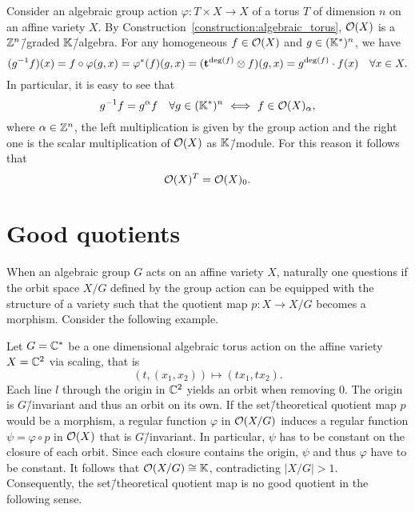\begin{ex}
	\label{example:regular_functions_torus_group_action}
	Consider an algebraic group action $\varphi\colon T \times X \rightarrow X$ of a torus $T$ of dimension $n$ on an affine variety $X$. By Construction~\ref{construction:algebraic_torus}, $\mathcal{O}(X)$ is a $\mathbb{Z}^n$\=/graded $\mathbb{K}$\=/algebra. For any homogeneous $f\in\mathcal{O}(X)$ and $g\in (\mathbb{K}^*)^n$, we have
	$$(g^{-1}f)(x) = f \circ \varphi(g,x) = \varphi^*(f)(g,x) = (\mathbf{t}^{\deg(f)} \otimes f)(g,x) = g^{\deg(f)}\cdot f(x)\quad \forall x\in X.$$
	In particular, it is easy to see that
	$$g^{-1}f = g^\alpha f\quad \forall g\in (\field^*)^n \ \Longleftrightarrow \ f\in\O(X)_\alpha,$$
	where $\alpha\in\mathbb{Z}^n$, the left multiplication is given by the group action and the right one is the scalar multiplication of $\mathcal{O}(X)$ as $\mathbb{K}$\=/module.
	For this reason it follows that
	$$ \mathcal{O}(X)^T = \mathcal{O}(X)_0.$$
\end{ex}

\section{Good quotients}
When an algebraic group $G$ acts on an affine variety $X$, naturally one questions if the orbit space $X/G$ defined by the group action can be equipped with the structure of a variety such that the quotient map $p\colon X\rightarrow X/G$ becomes a morphism. Consider the following example.

\begin{ex}
	\label{example:bad_quotient}
	Let $G=\mathbb{C}^*$ be a one dimensional algebraic torus action on the affine variety $X = \mathbb{C}^2$ via scaling, that is
	$$(t,(x_1,x_2)) \mapsto (tx_1,tx_2).$$
	Each line $l$ through the origin in $\mathbb{C}^2$ yields an orbit when removing 0. The origin is $G$\=/invariant and thus an orbit on its own.
	If the set\=/theoretical quotient map $p$ would be a morphism, a regular function $\varphi$ in $\mathcal{O}(X/G)$ induces a regular function $\psi = \varphi \circ p$ in $\mathcal{O}(X)$ that is $G$\=/invariant. In particular, $\psi$ has to be constant on the closure of each orbit. Since each closure contains the origin, $\psi$ and thus $\varphi$ have to be constant. It follows that $\mathcal{O}(X/G) \cong \mathbb{K}$, contradicting $|X/G| > 1$. Consequently, the set\=/theoretical quotient map is no good quotient in the following sense.
\end{ex}

